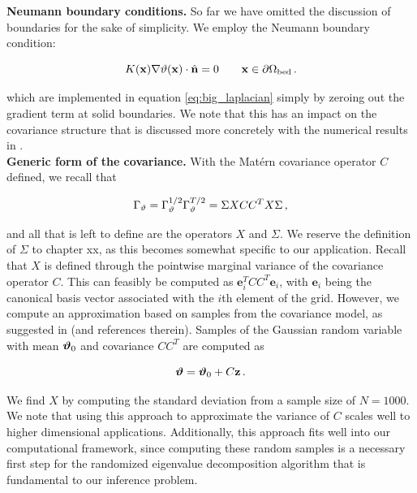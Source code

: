 \noindent\textbf{Neumann boundary conditions.}
So far we have omitted the discussion of boundaries for the sake of
simplicity.
We employ the Neumann boundary condition:
\begin{linenomath*}\begin{equation*}
    K(\mathbf{x})\nabla\vartheta(\mathbf{x}) \cdot \hat{\mathbf{n}} = 0 \qquad \mathbf{x}\in\partial\Omega_{\text{bed}} \, .
\end{equation*}\end{linenomath*}
which are implemented in equation \eqref{eq:big_laplacian}
simply by zeroing out the gradient term at solid boundaries.
We note that this has an impact on the covariance structure that is discussed
more concretely with the numerical results in
.\\

\noindent\textbf{Generic form of the covariance.}
With the Mat\'ern covariance operator $C$ defined, we recall that
\begin{linenomath*}\begin{equation*}
    \Gamma_{\vartheta} = \Gamma_{\vartheta}^{1/2}\Gamma_{\vartheta}^{T/2}
    = \Sigma X C C^T X \Sigma \, ,
\end{equation*}\end{linenomath*}
and all that is left to define are the operators $X$ and $\Sigma$.
We reserve the definition of $\Sigma$ to
chapter xx, as this becomes somewhat specific to our
application.
Recall that $X$ is defined through the pointwise marginal variance of the
covariance operator $C$.
This can feasibly be computed as $\mathbf{e}_i^TCC^T\mathbf{e}_i$, with
$\mathbf{e}_i$ being the canonical basis vector associated with the $i$th
element of the grid.
However, we compute an approximation based on samples from the covariance model, as
suggested in \citet{weaver_correlation_2001} (and references therein).
Samples of the Gaussian random variable with mean $\bm{\vartheta}_0$ and covariance
$C C^T$ are computed as
\begin{linenomath*}\begin{equation*}
    \bm{\vartheta} = \bm{\vartheta}_0 + C\mathbf{z} \, .
\end{equation*}\end{linenomath*}
We find $X$ by computing the standard deviation from a sample size of $N=1000$.
We note that using this approach to approximate the variance of $C$ scales well
to higher dimensional applications.
Additionally, this approach fits well into our computational framework, since
computing these random samples is a necessary first step for the randomized
eigenvalue decomposition algorithm that is fundamental to our inference problem.
